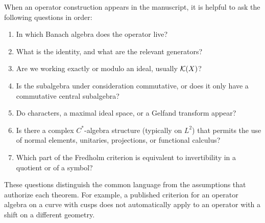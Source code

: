 When an operator construction appears in the manuscript, it is
helpful to ask the following questions in order:
\begin{enumerate}
\item In which Banach algebra does the operator live?
\item What is the identity, and what are the relevant generators?
\item Are we working exactly or modulo an ideal, usually $\mathcal K(X)$?
\item Is the subalgebra under consideration commutative, or does it only
      have a commutative central subalgebra?
\item Do characters, a maximal ideal space, or a Gelfand transform appear?
\item Is there a complex $C^*$-algebra structure (typically on $L^2$)
      that permits the use of normal elements, unitaries, projections,
      or functional calculus?
\item Which part of the Fredholm criterion is equivalent to
      invertibility in a quotient or of a symbol?
\end{enumerate}

These questions distinguish the common language from the assumptions
that authorize each theorem. For example, a published criterion for
an operator algebra on a curve with cusps does not automatically apply
to an operator with a shift on a different geometry.
